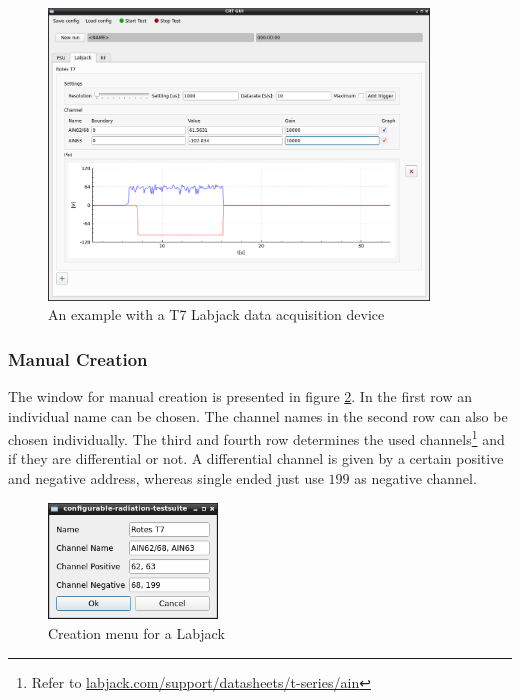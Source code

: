 \documentclass[10pt,a4paper]{article}
\begin{document}
	\begin{figure}[H]
	\centering
	\includegraphics[width=0.9\textwidth]{./3_LBJ_example.png}
	\caption{An example with a T7 Labjack data acquisition device}
	\label{f:lbj_example}
	\end{figure}
	
	\subsubsection{Manual Creation}	
	
	The window for manual creation is presented in figure \ref{f:lbj_menu}. In the first row an individual name can be chosen. The channel names in the second row can also be chosen individually. The third and fourth row determines the used channels\footnote{Refer to \url{labjack.com/support/datasheets/t-series/ain}} and if they are differential or not. A differential channel is given by a certain positive and negative address, whereas single ended just use $199$ as negative channel.
	
	
	\begin{figure}[H]
	\centering
	\includegraphics[width=0.4\textwidth]{./3_LBJ_menu.png}
	\caption{Creation menu for a Labjack}
	\label{f:lbj_menu}
	\end{figure}
	
\end{document}
